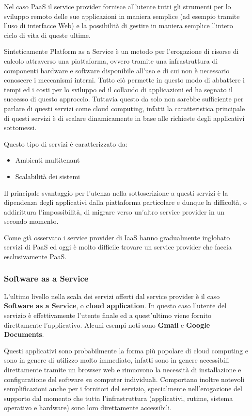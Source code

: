 Nel caso PaaS il service provider fornisce all'utente tutti gli
strumenti per lo sviluppo remoto delle sue applicazioni in maniera
semplice (ad esempio tramite l'uso di interfacce Web) e la possibilità
di gestire in maniera semplice l'intero ciclo di vita di queste ultime.

Sinteticamente Platform as a Service è un metodo per l'erogazione di
risorse di calcolo attraverso una piattaforma, ovvero tramite una
infrastruttura di componenti hardware e software disponibile all'uso e
di cui non è necessario conoscere i meccanismi interni. Tutto ciò
permette in questo modo di abbattere i tempi ed i costi per lo sviluppo
ed il collaudo di applicazioni ed ha segnato il successo di questo
approccio. Tuttavia questo da solo non sarebbe sufficiente per parlare
di questi servizi come cloud computing, infatti la caratteristica
principale di questi servizi è di scalare dinamicamente in base alle
richieste degli applicativi sottomessi.

Questo tipo di servizi è caratterizzato da:

\begin{itemize}
\tightlist
\item
  Ambienti multitenant
\item
  Scalabilità dei sistemi
\end{itemize}

Il principale svantaggio per l'utenza nella sottoscrizione a questi
servizi è la dipendenza degli applicativi dalla piattaforma particolare
e dunque la difficoltà, o addirittura l'impossibilità, di migrare verso
un'altro service provider in un secondo momento.

Come già osservato i service provider di IaaS hanno gradualmente
inglobato servizi di PaaS ed oggi è molto difficile trovare un service
provider che faccia esclusivamente PaaS.

\subsubsection{Software as a Service}\label{software-as-a-service}

L'ultimo livello nella scala dei servizi offerti dal service provider è
il caso \textbf{Software as a Service}, o \textbf{cloud application}. In
questo caso l'utente del servizio è effettivamente l'utente finale ed a
quest'ultimo viene fornito direttamente l'applicativo. Alcuni esempi
noti sono \textbf{Gmail} e \textbf{Google Documents}.

Questi applicativi sono probabilmente la forma più popolare di cloud
computing e sono in genere di utilizzo molto immediato, infatti sono in
genere accessibili direttamente tramite un browser web e rimuovono la
necessità di installazione e configuratione del software su computer
individuali. Comportano inoltre notevoli semplificazioni anche per i
fornitori del servizio, specialmente nell'erogazione del supporto dal
momento che tutta l'infrastruttura (applicativi, rutime, sistema
operativo e hardware) sono loro direttamente accessibili.

